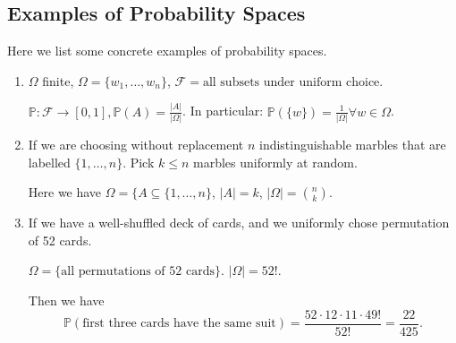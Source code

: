 \subsection{Examples of Probability Spaces}
\begin{eg}
    Here we list some concrete examples of probability spaces.
    \begin{enumerate}
\item \(\Omega\) finite, \(\Omega = \{w_1, \ldots , w_n \}\), \(\mathcal{F} = \text{all subsets under uniform choice}\).

\(\mathbb{P}:\mathcal{F} \to [0,1], \mathbb{P}(A) = \frac{\left\vert A \right\vert }{\left\vert \Omega \right\vert }\).
In particular: \(\mathbb{P}(\{w\}) = \frac{1}{\left\vert \Omega \right\vert} \forall w \in \Omega\).

\item If we are choosing without replacement
\(n\) indistinguishable marbles that are labelled \(\{1, \ldots, n \}\). Pick \(k \leq n\) marbles uniformly at random.

Here we have \(\Omega=\{A \subseteq \{1, \ldots , n \}\), \(\left\vert A \right\vert = k\), \(\left\vert \Omega \right\vert = \binom{n}{k}\).

\item If we have a well-shuffled deck of cards, and we uniformly chose permutation of 52 cards.

\(\Omega = \{\text{all permutations of 52 cards}\}\). \(\left\vert \Omega \right\vert = 52!\).

Then we have
\[
    \mathbb{P}(\text{first three cards have the same suit}) = \frac{52 \cdot 12 \cdot 11 \cdot 49!}{52!} = \frac{22}{425}.
\]
    \end{enumerate}
\end{eg}